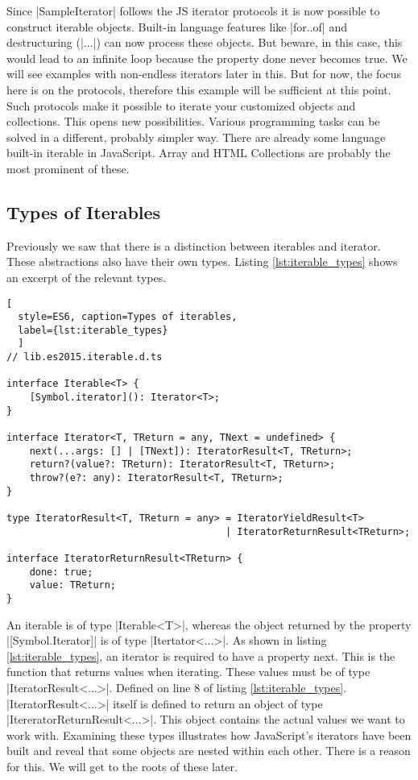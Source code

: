 Since |SampleIterator| follows the JS iterator protocols it is now possible to
construct iterable objects.
Built-in language features like |for..of| and destructuring (|...|) can now process these objects. 
But beware, in this case, this would lead to an infinite loop because the 
property done never becomes true. We will see examples with non-endless iterators 
later in this. But for now, the focus here is on the protocols, therefore this 
example will be sufficient at this point.
\newline
Such protocols make it possible to iterate your customized objects and
collections. This opens new possibilities. Various programming tasks can be 
solved in a different, probably simpler way.
\newline
There are already some language built-in iterable in JavaScript. Array and
HTML Collections are probably the most prominent of these.

\subsection{Types of Iterables}
Previously we saw that there is a distinction between iterables and iterator. 
These abstractions also have their own types. 
Listing \ref{lst:iterable_types}  shows an excerpt of the relevant types.

\begin{lstlisting}[
  style=ES6, caption=Types of iterables,
  label={lst:iterable_types}
  ]
// lib.es2015.iterable.d.ts

interface Iterable<T> {
    [Symbol.iterator](): Iterator<T>;
}

interface Iterator<T, TReturn = any, TNext = undefined> {
    next(...args: [] | [TNext]): IteratorResult<T, TReturn>;
    return?(value?: TReturn): IteratorResult<T, TReturn>;
    throw?(e?: any): IteratorResult<T, TReturn>;
}

type IteratorResult<T, TReturn = any> = IteratorYieldResult<T> 
                                      | IteratorReturnResult<TReturn>;

interface IteratorReturnResult<TReturn> {
    done: true;
    value: TReturn;
}
\end{lstlisting}

An iterable is of type |Iterable<T>|, whereas the object returned by the property
|[Symbol.Iterator]| is of type |Itertator<...>|. As shown in listing
\ref{lst:iterable_types}, an iterator is required to have a property next. 
This is the function that returns values when iterating. These values must be 
of type |IteratorResult<...>|. Defined on line 8 of listing 
\ref{lst:iterable_types}. |IteratorResult<...>| itself is defined to return an 
object of type |ItereratorReturnResult<...>|. This object contains the actual 
values we want to work with. Examining these types illustrates how JavaScript's 
iterators have been built and reveal that some objects are nested within each
other. There is a reason for this. We will get to the roots of these later.

